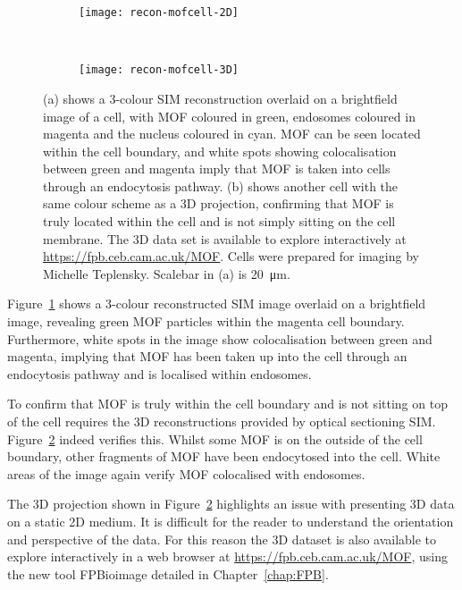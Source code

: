 \begin{figure}[tbp!]
\centering
\begin{subfigure}[b]{0.7\textwidth}
	\texttt{[image: recon-mofcell-2D]}
	\caption{}\label{fig:recon-mofcell-2D}
\end{subfigure}

~\newline
\begin{subfigure}[b]{0.7\textwidth}
	\texttt{[image: recon-mofcell-3D]}
	\caption{}\label{fig:recon-mofcell-3D}
\end{subfigure}
\caption[LAG SIM: 3D SIM reconstruction reveals MOFs endocytosed by HeLa cells]{(a) shows a 3-colour SIM reconstruction overlaid on a brightfield image of a cell, with MOF coloured in green, endosomes coloured in magenta and the nucleus coloured in cyan. MOF can be seen located within the cell boundary, and white spots showing colocalisation between green and magenta imply that MOF is taken into cells through an endocytosis pathway. (b) shows another cell with the same colour scheme as a 3D projection, confirming that MOF is truly located within the cell and is not simply sitting on the cell membrane. The 3D data set is available to explore interactively at \mbox{\url{https://fpb.ceb.cam.ac.uk/MOF}}. Cells were prepared for imaging by Michelle Teplensky. Scalebar in (a) is \SI{20}{\micro\metre}. }
\label{fig:recon-mofcell}
\end{figure}
\afterpage{\clearpage}

Figure~\ref{fig:recon-mofcell-2D} shows a 3-colour reconstructed SIM image overlaid on a brightfield image, revealing green MOF particles within the magenta cell boundary. 
Furthermore, white spots in the image show colocalisation between green and magenta, implying that MOF has been taken up into the cell through an endocytosis pathway and is localised within endosomes. 

To confirm that MOF is truly within the cell boundary and is not sitting on top of the cell requires the 3D reconstructions provided by optical sectioning SIM. 
Figure~\ref{fig:recon-mofcell-3D} indeed verifies this.
Whilst some MOF is on the outside of the cell boundary, other fragments of MOF have been endocytosed into the cell. 
White areas of the image again verify MOF colocalised with endosomes. 

The 3D projection shown in Figure~\ref{fig:recon-mofcell-3D} highlights an issue with presenting 3D data on a static 2D medium. 
It is difficult for the reader to understand the orientation and perspective of the data.
For this reason the 3D dataset is also available to explore interactively in a web browser at \url{https://fpb.ceb.cam.ac.uk/MOF}, using the new tool FPBioimage detailed in Chapter~\ref{chap:FPB}. 


